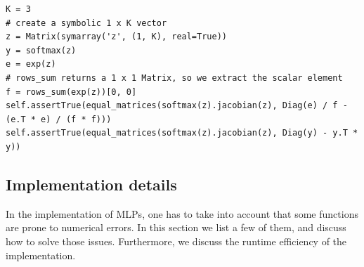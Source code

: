\documentclass[twoside,11pt]{article}
\newcommand{\const}[1]{\ensuremath{\mathrm{#1}}} %
\begin{document}
\begin{lstfloat}[!ht]
\begin{lstlisting}
K = 3
# create a symbolic 1 x K vector
z = Matrix(symarray('z', (1, K), real=True))
y = softmax(z)
e = exp(z)
# rows_sum returns a 1 x 1 Matrix, so we extract the scalar element
f = rows_sum(exp(z))[0, 0]
self.assertTrue(equal_matrices(softmax(z).jacobian(z), Diag(e) / f - (e.T * e) / (f * f)))
self.assertTrue(equal_matrices(softmax(z).jacobian(z), Diag(y) - y.T * y))
\end{lstlisting}
\caption{Checking the derivation in \eqref{eq:softmax-derivation} using SymPy.
The derivation is checked for an arbitrary vector $z$, but with a concrete value for its size $\const{K}$. Note that $e^z \cdot 1_\const{K}$ corresponds to \texttt{rows\_sum(exp(z))} according to Table \ref{table:matrix-operations}.
}
\label{listing:derivation-validation}
\end{lstfloat}


\subsection{Implementation details}
In the implementation of MLPs, one has to take into account that some functions are prone to numerical errors. In this section we list a few of them, and discuss how to solve those issues. Furthermore, we discuss the runtime efficiency of the implementation.
\end{document}
